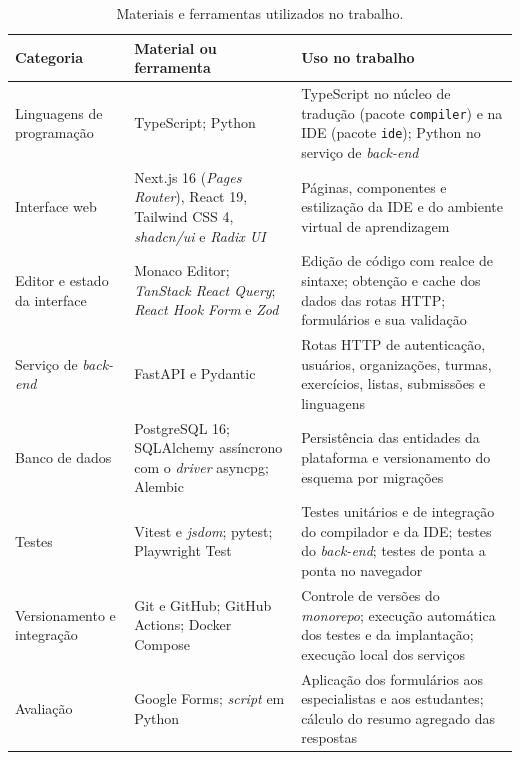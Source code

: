 \begin{table}[htbp]
    \centering
    \caption{Materiais e ferramentas utilizados no trabalho.}
    \label{tab:materiais-ferramentas}
    \footnotesize
    \setlength{\tabcolsep}{4pt}
    \renewcommand{\arraystretch}{1.2}
    \begin{tabular}{|>{\raggedright\arraybackslash}p{2.8cm}|>{\raggedright\arraybackslash}p{4.9cm}|>{\raggedright\arraybackslash}p{6.4cm}|}
        \hline
        \textbf{Categoria} & \textbf{Material ou ferramenta} & \textbf{Uso no trabalho} \\
        \hline
        Linguagens de programação & TypeScript; Python & TypeScript no núcleo de tradução (pacote \texttt{compiler}) e na IDE (pacote \texttt{ide}); Python no serviço de \textit{back-end} \\
        \hline
        Interface web & Next.js 16 (\textit{Pages Router}), React 19, Tailwind CSS 4, \textit{shadcn/ui} e \textit{Radix UI} & Páginas, componentes e estilização da IDE e do ambiente virtual de aprendizagem \\
        \hline
        Editor e estado da interface & Monaco Editor; \textit{TanStack React Query}; \textit{React Hook Form} e \textit{Zod} & Edição de código com realce de sintaxe; obtenção e cache dos dados das rotas HTTP; formulários e sua validação \\
        \hline
        Serviço de \textit{back-end} & FastAPI e Pydantic & Rotas HTTP de autenticação, usuários, organizações, turmas, exercícios, listas, submissões e linguagens \\
        \hline
        Banco de dados & PostgreSQL 16; SQLAlchemy assíncrono com o \textit{driver} asyncpg; Alembic & Persistência das entidades da plataforma e versionamento do esquema por migrações \\
        \hline
        Testes & Vitest e \textit{jsdom}; pytest; Playwright Test & Testes unitários e de integração do compilador e da IDE; testes do \textit{back-end}; testes de ponta a ponta no navegador \\
        \hline
        Versionamento e integração & Git e GitHub; GitHub Actions; Docker Compose & Controle de versões do \textit{monorepo}; execução automática dos testes e da implantação; execução local dos serviços \\
        \hline
        Avaliação & Google Forms; \textit{script} em Python & Aplicação dos formulários aos especialistas e aos estudantes; cálculo do resumo agregado das respostas \\
        \hline
    \end{tabular}
\end{table}

